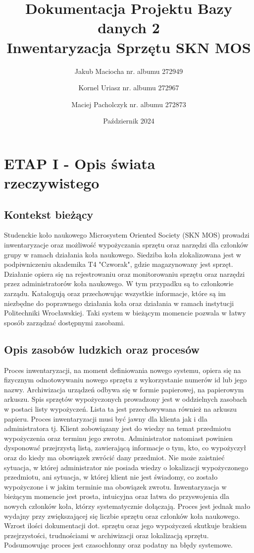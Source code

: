 \documentclass{article}
\title{Dokumentacja Projektu Bazy danych 2 \\ \large Inwentaryzacja Sprzętu SKN MOS }
\author{Jakub Maciocha nr. albumu 272949 \and Kornel Uriasz nr. albumu 272967 \and Maciej Pacholczyk nr. albumu 272873}
\date{Październik 2024}
\begin{document}
\maketitle

\newpage
\section{\textbf{ETAP I - Opis świata rzeczywistego}}
    \subsection{Kontekst bieżący}
    Studenckie koło naukowego Microsystem Oriented Society (SKN MOS) prowadzi inwentaryzacje oraz możliwość wypożyczania sprzętu oraz narzędzi dla członków grupy w ramach działania koła naukowego. Siedziba koła zlokalizowana jest w podpiwniczeniu akademika T4 "Czworak", gdzie magazynowany jest sprzęt. Działanie opiera się na rejestrowaniu oraz monitorowaniu sprzętu oraz narzędzi przez administratorów koła naukowego. W tym przypadku są to członkowie zarządu. Katalogują oraz przechowując wszystkie informacje, które są im niezbędne do poprawnego działania koła oraz działania w ramach instytucji Politechniki Wrocławskiej. Taki system w bieżącym momencie pozwala w łatwy sposób zarządzać dostępnymi zasobami.

    \subsection{Opis zasobów ludzkich oraz procesów}
    Proces inwentaryzacji, na moment definiowania nowego systemu, opiera się na fizycznym odnotowywaniu nowego sprzętu z wykorzystanie numerów id lub jego nazwy. Archiwizacja urządzeń odbywa się w formie papierowej, na papierowym arkuszu. Spis sprzętów wypożyczonych prowadzony jest w oddzielnych zasobach w postaci listy  wypożyczeń. Lista ta jest przechowywana również na arkuszu papieru. Proces inwentaryzacji musi być jawny dla klienta jak i dla administratora tj. Klient zobowiązany jest do wiedzy na temat przedmiotu wypożyczenia oraz terminu jego zwrotu. Administrator natomiast powinien dysponować przejrzystą listą, zawierającą informacje o tym, kto, co wypożyczył oraz do kiedy ma obowiązek zwrócić dany przedmiot. Nie może zaistnieć sytuacja, w której administrator nie posiada wiedzy o lokalizacji wypożyczonego przedmiotu, ani sytuacja, w której klient nie jest świadomy, co zostało wypożyczone i w jakim terminie ma obowiązek zwrotu.    
    Inwentaryzacja w bieżącym momencie jest prosta, intuicyjna oraz łatwa do przyswojenia dla nowych członków koła, którzy systematycznie dołączają. Proces jest jednak mało wydajny przy zwiększającej się liczbie sprzętu oraz członków koła naukowego. Wzrost ilości dokumentacji dot. sprzętu oraz jego wypożyczeń skutkuje brakiem przejrzystości, trudnościami w archiwizacji oraz lokalizacją sprzętu. Podsumowując proces jest czasochłonny oraz podatny na błędy systemowe.
\end{document}
